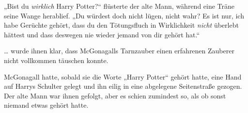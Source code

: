 „Bist du \emph{wirklich} Harry Potter?“ flüsterte der alte Mann, während eine Träne seine Wange herablief.
„Du würdest doch nicht lügen, nicht wahr? Es ist nur, ich habe Gerüchte gehört, dass du den Tötungsfluch in Wirklichkeit \emph{nicht} überlebt hättest und dass deswegen nie wieder jemand von dir gehört hat.“

… wurde ihnen klar, dass McGonagalls Tarnzauber einen erfahrenen Zauberer nicht vollkommen täuschen konnte.

McGonagall hatte, sobald sie die Worte
„Harry Potter“ gehört hatte, eine Hand auf Harrys Schulter gelegt und ihn eilig in eine abgelegene Seitenstraße gezogen. Der alte Mann war ihnen gefolgt, aber es schien zumindest so, als ob sonst niemand etwas gehört hatte.

